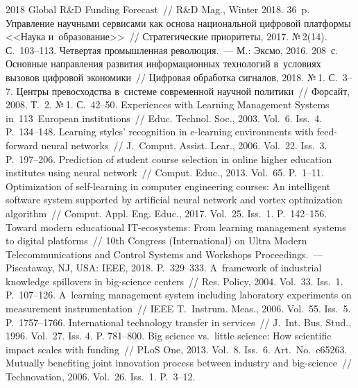 \begin{multicols}{2}
{{\begin{thebibliography}{99}
2018 Global R\&D Funding Forecast~// R\&D Mag., Winter 2018. 36~p.
 Управление научными сервисами 
как основа национальной циф\-ро\-вой платформы <<Наука и~образование>>~// 
Стратегические приоритеты, 2017. №\,2(14). С.~103--113.
 Четвертая промышленная революция.~---
М.: Эксмо, 2016. 208~с.
 Основные направления развития информационных технологий 
в~условиях вызовов цифровой экономики~// Цифровая обработка сигналов, 2018. №\,1. 
С.~3--7.
 Центры превосходства в~системе современной научной политики~// 
Форсайт, 2008. Т.~2. №\,1. С.~42--50.
 Experiences with Learning Management Systems 
in~113~European institutions~// Educ. Technol. Soc., 2003. 
Vol.~6. Iss.~4. P.~134--148.
Learning styles' recognition in e-learning environments 
with feed-forward neural networks~// J.~Comput. Assist. Lear., 2006. Vol.~22. Iss.~3. P.~197--206.
Prediction of student course selection in online higher education 
institutes using neural network~// Comput. Educ., 2013. Vol.~65. P.~1--11.
 Optimization of self-learning in computer engineering courses: 
An intelligent software system supported by artificial neural network and vortex 
optimization algorithm~// Comput. Appl. Eng. Educ., 2017. Vol.~25. Iss.~1. P.~142--156.
 Toward modern educational
IT-ecosystems: From learning management systems to digital platforms~// 
10th Congress (International)
on Ultra Modern Telecommunications and
Control Systems and Workshops Proceedings.~---
Piscataway, NJ, USA: IEEE, 2018.
P.~329--333.
A~framework of industrial knowledge spillovers in big-science centers~// 
Res. Policy, 2004. Vol.~33. Iss.~1. P.~107--126.
 A~learning management system including laboratory 
experiments on measurement instrumentation~// IEEE T.~Instrum. 
Meas., 2006. Vol.~55. Iss.~5. P.~1757--1766.
 International technology transfer in services~// 
J.~Int. Bus. Stud., 1996. Vol.~27. Iss. 4. P. 781--800.
 Big science vs.\ little science: How 
scientific impact scales with funding~// PLoS One, 2013. Vol.~8. Iss.~6. Art.~No.~e65263.
 Mutually benefiting joint innovation process 
between industry and big-science~// Technovation, 2006. Vol.~26. Iss.~1. P.~3--12.
 \end{thebibliography}

 }
 }

\end{multicols}

